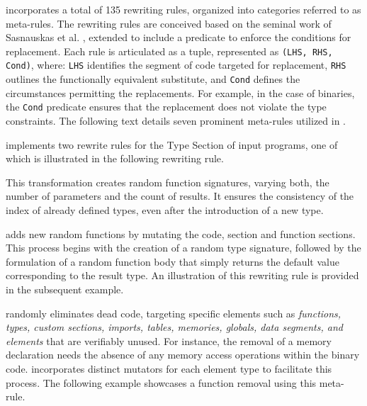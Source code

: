 



\tool incorporates a total of 135 rewriting rules, organized into categories referred to as meta-rules. 
The rewriting rules are conceived based on the seminal work of Sasnauskas et al. \cite{2017arXiv171104422S}, extended to include a predicate to enforce the conditions for replacement. 
Each rule is articulated as a tuple, represented as \texttt{(LHS, RHS, Cond)}, where: \texttt{LHS} identifies the segment of code targeted for replacement, \texttt{RHS} outlines the functionally equivalent substitute, and \texttt{Cond} defines the circumstances permitting the replacements.
For example, in the case of \Wasm binaries, the \texttt{Cond} predicate ensures that the replacement does not violate the type constraints. 
The following text details seven prominent meta-rules utilized in \tool.


\tool implements two rewrite rules for the Type Section of input \Wasm programs, one of which is illustrated in the following rewriting rule. 



This transformation creates random function signatures, varying both, the number of parameters and the count of results. 
It ensures the consistency of the index of already defined types, even after the introduction of a new type.

\tool adds new random functions by mutating the code, section and function sections. 
This process begins with the creation of a random type signature, followed by the formulation of a random function body that simply returns the default value corresponding to the result type. 
An illustration of this rewriting rule is provided in the subsequent example.



 \tool randomly eliminates dead code, targeting specific elements such as \emph{functions, types, custom sections, imports, tables, memories, globals, data segments, and elements} that are verifiably unused. 
For instance, the removal of a memory declaration needs the absence of any memory access operations within the binary code. 
\tool incorporates distinct mutators for each element type to facilitate this process.
The following example showcases a function removal using this meta-rule.



